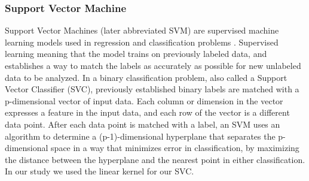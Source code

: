 \documentclass[review]{elsarticle}
\begin{document}
\subsubsection{Support Vector Machine}
\label{svm}

Support Vector Machines (later abbreviated SVM) are supervised machine learning models used in regression and classification problems \cite[][]{svm}. Supervised learning meaning that the model trains on previously labeled data, and establishes a way to match the labels as accurately as possible for new unlabeled data to be analyzed. In a binary classification problem, also called a Support Vector Classifier (SVC), previously established binary labels are matched with a p-dimensional vector of input data. Each column or dimension in the vector expresses a feature in the input data, and each row of the vector is a different data point. After each data point is matched with a label, an SVM uses an algorithm to determine a (p-1)-dimensional hyperplane that separates the p-dimensional space in a way that minimizes error in classification, by maximizing the distance between the hyperplane and the nearest point in either classification. In our study we used the linear kernel for our SVC.





\end{document}
